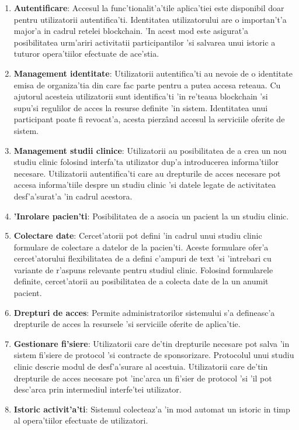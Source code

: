 \documentclass[12pt,a4paper,twoside]{report}
\begin{document}
\begin{enumerate}
	\item \textbf{Autentificare}: Accesul la func'tionalit'a'tile aplica'tiei este disponibil doar pentru utilizatorii autentifica'ti. Identitatea utilizatorului are o importan't'a major'a in cadrul retelei blockchain. 'In acest mod este asigurat'a posibilitatea  urm'ariri activitatii participantilor 'si salvarea unui istoric a tuturor opera'tiilor efectuate de ace'stia. 
	\item \textbf{Management identitate}: Utilizatorii autentifica'ti au nevoie de o identitate emisa de organiza'tia din care fac parte pentru a putea accesa reteaua. Cu ajutorul acesteia utilizatorii sunt identifica'ti 'in re'teaua blockchain 'si supu'si regulilor de acces la resurse definite 'in sistem. Identitatea unui participant poate fi revocat'a, acesta pierz\^and accesul la serviciile oferite de sistem.
	\item \textbf{Management studii clinice}: Utilizatorii au posibilitatea de a crea un nou studiu clinic folosind interfa'ta utilizator dup'a introducerea informa'tiilor necesare.  Utilizatorii autentifica'ti care au drepturile de acces necesare pot accesa informa'tiile despre un studiu clinic 'si datele legate de activitatea desf'a'surat'a 'in cadrul acestora.
	\item \textbf{'Inrolare pacien'ti}: Posibilitatea de a asocia un pacient la un studiu clinic.
	\item \textbf{Colectare date}: Cercet'atorii pot defini 'in cadrul unui studiu clinic formulare de colectare a datelor de la pacien'ti. Aceste formulare ofer'a cercet'atorului flexibilitatea de a defini c'ampuri de text 'si 'intrebari cu variante de r'aspuns relevante pentru studiul clinic. Folosind formularele definite, cercet'atorii au posibilitatea de a colecta date de la un anumit pacient.
	\item \textbf{Drepturi de acces}: Permite administratorilor sistemului s'a defineasc'a drepturile de acces la resursele 'si serviciile oferite de aplica'tie.
	\item \textbf{Gestionare fi'siere}: Utilizatorii care de'tin drepturile necesare pot salva 'in sistem fi'siere de protocol 'si contracte de sponsorizare. Protocolul unui studiu clinic descrie modul de desf'a'surare al acestuia. Utilizatorii care de'tin drepturile de acces necesare pot 'inc'arca un fi'sier de protocol 'si 'il pot desc'arca prin intermediul interfe'tei utilizator.
	\item \textbf{Istoric activit'a'ti}: Sistemul colecteaz'a 'in mod automat un istoric in timp al opera'tiilor efectuate de utilizatori. 
\end{enumerate}
\end{document}
